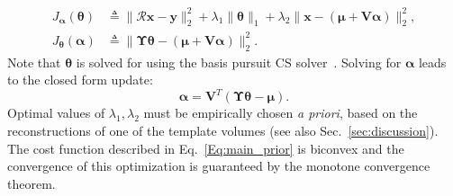 \documentclass[journal]{IEEEtran}
\begin{document}
\begin{align}
J_{\boldsymbol{\alpha}}(\boldsymbol{\theta}) &\triangleq \lVert\boldsymbol{\mathcal{R} x- y}\rVert_2^2  + \lambda_1\lVert\boldsymbol{\theta}\rVert_1+\lambda_2\lVert\boldsymbol{x} - (\boldsymbol{\mu + V\alpha})\rVert_2^2, \\
J_{\boldsymbol\theta}(\boldsymbol{\alpha}) &\triangleq \lVert\boldsymbol{\Upsilon\theta} - (\boldsymbol{\mu + V\alpha})\rVert_2^2.
\end{align}
Note that $\boldsymbol{\theta}$ is solved for using the basis pursuit CS solver~\cite{l1ls}. Solving for $\boldsymbol{\alpha}$ leads to the closed form update:
\begin{equation}
\boldsymbol{\boldsymbol{\alpha}} = \boldsymbol{V}^T(\boldsymbol{\Upsilon \theta} -\boldsymbol{\mu}).
\end{equation}
 Optimal values of $\lambda_1, \lambda_2$ must be empirically chosen \textit{a priori}, based on the reconstructions of one of the template volumes (see also Sec.~\ref{sec:discussion}). The cost function described in Eq.~\ref{Eq:main_prior} is biconvex and the convergence of this optimization is guaranteed by the monotone convergence theorem.
 \vspace{2mm}
\end{document}
